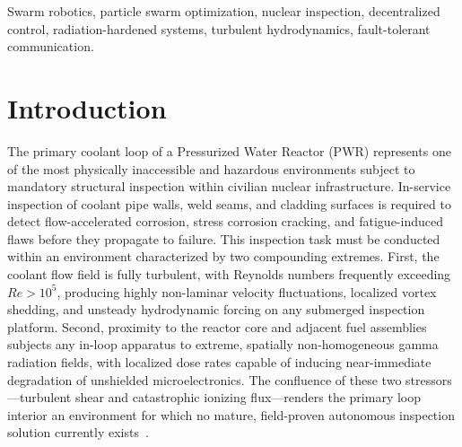 \documentclass[journal]{IEEEtran}
\begin{document}
\begin{IEEEkeywords}
Swarm robotics, particle swarm optimization, nuclear inspection, decentralized control, radiation-hardened systems, turbulent hydrodynamics, fault-tolerant communication.
\end{IEEEkeywords}

\section{Introduction}
\label{sec:intro}

The primary coolant loop of a Pressurized Water Reactor (PWR) represents one of the most physically inaccessible and hazardous environments subject to mandatory structural inspection within civilian nuclear infrastructure. In-service inspection of coolant pipe walls, weld seams, and cladding surfaces is required to detect flow-accelerated corrosion, stress corrosion cracking, and fatigue-induced flaws before they propagate to failure. This inspection task must be conducted within an environment characterized by two compounding extremes. First, the coolant flow field is fully turbulent, with Reynolds numbers frequently exceeding $Re > 10^5$, producing highly non-laminar velocity fluctuations, localized vortex shedding, and unsteady hydrodynamic forcing on any submerged inspection platform. Second, proximity to the reactor core and adjacent fuel assemblies subjects any in-loop apparatus to extreme, spatially non-homogeneous gamma radiation fields, with localized dose rates capable of inducing near-immediate degradation of unshielded microelectronics. The confluence of these two stressors---turbulent shear and catastrophic ionizing flux---renders the primary loop interior an environment for which no mature, field-proven autonomous inspection solution currently exists~\cite{pwr_inspection,perrow_accidents}.
\end{document}

